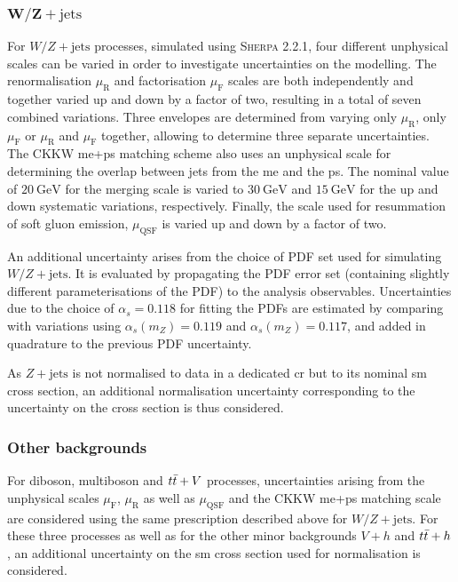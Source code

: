  \subsubsection{$\boldsymbol{W/Z+\mathrm{jets}}$}
 
 For $W/Z+\mathrm{jets}$ processes, simulated using \textsc{Sherpa 2.2.1}, four different unphysical scales can be varied in order to investigate uncertainties on the modelling. The renormalisation $\mu_\mathrm{R}$ and factorisation $\mu_\mathrm{F}$ scales are both independently and together varied up and down by a factor of two, resulting in a total of seven combined variations. Three envelopes are determined from varying only $\mu_\mathrm{R}$, only $\mu_\mathrm{F}$ or $\mu_\mathrm{R}$ and $\mu_\mathrm{F}$ together, allowing to determine three separate uncertainties. The CKKW \gls{me}+\gls{ps} matching scheme also uses an unphysical scale for determining the overlap between jets from the \gls{me} and the \gls{ps}. The nominal value of $\SI{20}{\GeV}$ for the merging scale is varied to $\SI{30}{\GeV}$ and $\SI{15}{\GeV}$ for the up and down systematic variations, respectively. Finally, the scale used for resummation of soft gluon emission, $\mu_\mathrm{QSF}$ is varied up and down by a factor of two.
 
 An additional uncertainty arises from the choice of \gls{PDF} set used for simulating $W/Z+\mathrm{jets}$. It is evaluated by propagating the \gls{PDF} error set (containing slightly different parameterisations of the \gls{PDF}) to the analysis observables. Uncertainties due to the choice of $\alpha_s = 0.118$ for fitting the \glspl{PDF} are estimated by comparing with variations using $\alpha_s(m_Z) = 0.119$ and $\alpha_s(m_Z) = 0.117$, and added in quadrature to the previous \gls{PDF} uncertainty.
 
 As $Z+\mathrm{jets}$ is not normalised to data in a dedicated \gls{cr} but to its nominal \gls{sm} cross section, an additional normalisation uncertainty corresponding to the uncertainty on the cross section is thus considered.
  
 \subsubsection{Other backgrounds}
 
 For diboson, multiboson and $t\bar{t}+V$ processes, uncertainties arising from the unphysical scales $\mu_\mathrm{F}$, $\mu_\mathrm{R}$ as well as $\mu_\mathrm{QSF}$ and the CKKW \gls{me}+\gls{ps} matching scale are considered using the same prescription described above for $W/Z+\mathrm{jets}$. For these three processes as well as for the other minor backgrounds $V+h$ and $t\bar{t}+h$, an additional uncertainty on the \gls{sm} cross section used for normalisation is considered.
  
